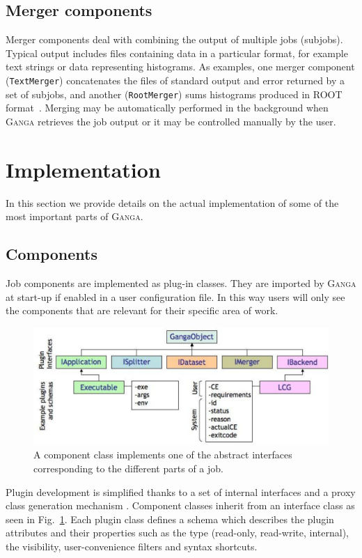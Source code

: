 \documentclass{elsart}
\def\ganga {\textsc{Ganga}\xspace}
\newcommand{\code}[1]{\texttt{#1}}
\begin{document}
\subsection{Merger components}
Merger components deal with combining the output of multiple jobs
(subjobs). Typical output includes files containing data in a
particular format, for example text strings or data representing
histograms. As examples, one merger component (\code{TextMerger})
concatenates the files of standard output and error returned by a set
of subjobs, and another (\code{RootMerger}) sums histograms produced
in ROOT format~\cite{ROOT}. Merging may be automatically performed in
the background when \ganga retrieves the job output or it may be
controlled manually by the user.

\section{Implementation}
\label{sec:implementation}
In this section we provide details on the actual implementation of some of the
most important parts of \ganga.

\subsection{Components}
\label{sec:ComponentImplementation}
Job components are implemented as plug-in classes. They are imported by \ganga
at start-up if enabled in a user configuration file. In this way users
will only see the components that are relevant for their specific area of
work.

\begin{figure}
  \centering
  \includegraphics[width=14cm]{GangaPlugin.pdf}  
  \caption{A component class implements one of the abstract interfaces
    corresponding to the different parts of a job.}
  \label{fig:Components}
\end{figure}
Plugin development is simplified thanks to a set of internal interfaces and a
proxy class generation mechanism \cite{GoF}. Component classes inherit from an interface class
as seen in Fig.~\ref{fig:Components}. Each plugin class defines a schema which
describes the plugin attributes and their properties such as the type
(read-only, read-write, internal), the visibility, user-convenience filters
and syntax shortcuts.
\end{document}
